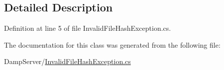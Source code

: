 \subsection{Detailed Description}


Definition at line 5 of file Invalid\-File\-Hash\-Exception.\-cs.



The documentation for this class was generated from the following file\-:\begin{DoxyCompactItemize}
\item 
Damp\-Server/\hyperlink{_invalid_file_hash_exception_8cs}{Invalid\-File\-Hash\-Exception.\-cs}\end{DoxyCompactItemize}
